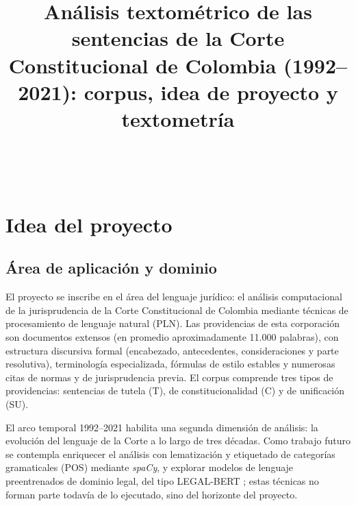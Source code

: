 \documentclass[stu,12pt,spanish,floatsintext,natbib]{apa7}
\title{An\'alisis textom\'etrico de las sentencias de la Corte
  Constitucional de Colombia (1992--2021): corpus, idea de proyecto y
  textometr\'ia}
\begin{document}
\maketitle

\setbox\precitebox\hbox{%
  \citep{aletras2016predicting,anzolaCortes2021algoritmos,%
    barbosaBecerra2021comportamiento,chalkidis2020legalbert,%
    gonzalezGonzalez2023automatic,hacohenKerner2020influence,%
    loffler2025predicting,manuel2022sentencias,raj2026collective,%
    soh2019legalarea}}

\section{Idea del proyecto}

\subsection{Área de aplicación y dominio}
El proyecto se inscribe en el área del lenguaje jurídico: el análisis
computacional de la jurisprudencia de la Corte Constitucional de Colombia
mediante técnicas de procesamiento de lenguaje natural (PLN). Las
providencias de esta corporación son documentos extensos (en promedio
aproximadamente 11.000 palabras), con estructura discursiva formal
(encabezado, antecedentes, consideraciones y parte resolutiva),
terminología especializada, fórmulas de estilo estables y numerosas citas
de normas y de jurisprudencia previa. El corpus comprende tres tipos de
providencias: sentencias de tutela (T), de constitucionalidad (C) y de
unificación (SU).

El arco temporal 1992--2021 habilita una segunda dimensión de análisis:
la evolución del lenguaje de la Corte a lo largo de tres décadas. Como
trabajo futuro se contempla enriquecer el análisis con lematización y
etiquetado de categorías gramaticales (POS) mediante \emph{spaCy}, y
explorar modelos de lenguaje preentrenados de dominio legal, del tipo
LEGAL-BERT \citep{chalkidis2020legalbert}; estas técnicas no forman parte
todavía de lo ejecutado, sino del horizonte del proyecto.
\end{document}
